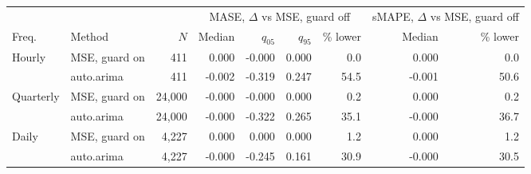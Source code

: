 \begin{tabular}{llrrrrrrr}
\toprule
 & & & \multicolumn{4}{c}{MASE, $\Delta$ vs MSE, guard off} & \multicolumn{2}{c}{sMAPE, $\Delta$ vs MSE, guard off} \\
\cmidrule(lr){4-7}\cmidrule(lr){8-9}
Freq. & Method & $N$ & Median & $q_{05}$ & $q_{95}$ & \% lower & Median & \% lower \\
\midrule
Hourly & MSE, guard on & 411 & 0.000 & -0.000 & 0.000 & 0.0 & 0.000 & 0.0 \\
 & auto.arima & 411 & -0.002 & -0.319 & 0.247 & 54.5 & -0.001 & 50.6 \\
\addlinespace
Quarterly & MSE, guard on & 24{,}000 & -0.000 & -0.000 & 0.000 & 0.2 & 0.000 & 0.2 \\
 & auto.arima & 24{,}000 & -0.000 & -0.322 & 0.265 & 35.1 & -0.000 & 36.7 \\
\addlinespace
Daily & MSE, guard on & 4{,}227 & 0.000 & 0.000 & 0.000 & 1.2 & 0.000 & 1.2 \\
 & auto.arima & 4{,}227 & -0.000 & -0.245 & 0.161 & 30.9 & -0.000 & 30.5 \\
\bottomrule
\end{tabular}
